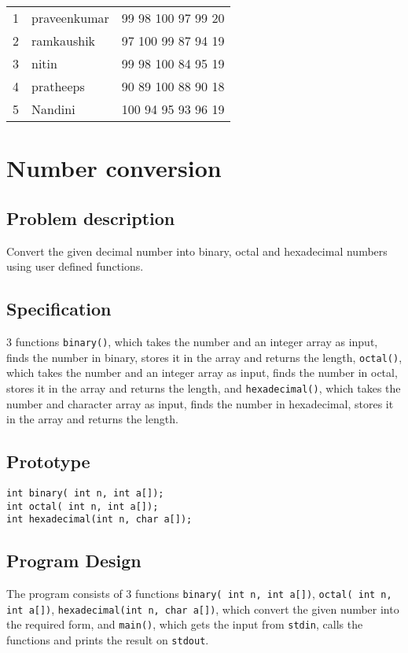 \documentclass[11pt]{article}
\begin{document}
\begin{center}
\begin{tabular}{rll}
1 & praveenkumar & 99 98 100 97 99   20\\
2 & ramkaushik & 97 100 99 87 94   19\\
3 & nitin & 99 98 100 84 95   19\\
4 & pratheeps & 90 89 100 88 90   18\\
5 & Nandini & 100 94 95 93 96   19\\
\end{tabular}
\end{center}

\section{Number conversion}
\label{sec-3}
\subsection*{Problem description}
\label{sec-3-1}
Convert the given decimal number into binary, octal and hexadecimal numbers using user
defined functions.
\subsection*{Specification}
\label{sec-3-2}
3 functions \texttt{binary()}, which takes the number and an integer
array as input, finds the number in binary, stores it in the
array and returns the length, \texttt{octal()}, which takes the number 
and an integer array as input, finds the number in octal, 
stores it in the array and returns the length, and \texttt{hexadecimal()},
which takes the number and character array as input, finds the
number in hexadecimal, stores it in the array and returns the length.
\subsection*{Prototype}
\label{sec-3-3}
\begin{verbatim}
int binary( int n, int a[]);
int octal( int n, int a[]);
int hexadecimal(int n, char a[]);
\end{verbatim}
\subsection*{Program Design}
\label{sec-3-4}
The program consists of 3 functions \texttt{binary( int n, int a[])},
\texttt{octal( int n, int a[])}, \texttt{hexadecimal(int n, char a[])}, 
which convert the given number into the required form, and 
\texttt{main()}, which gets the input from \texttt{stdin}, calls the 
functions and prints the result on \texttt{stdout}.
\end{document}
